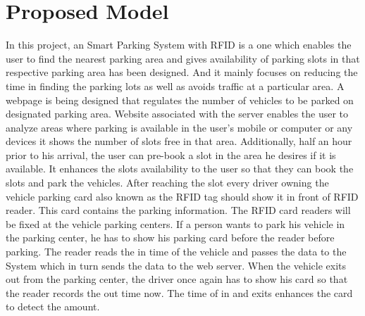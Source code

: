 \documentclass[12pt,a4paper]{report}
\begin{document}
\section{Proposed Model}
In this project, an Smart Parking System with RFID is a
one which enables the user to find the nearest parking area and gives availability of parking slots in that respective parking area has
been designed. And it mainly focuses on reducing the time in finding the parking lots as well as avoids traffic at a particular area. A
webpage is being designed that regulates the number of vehicles to be parked on designated parking area.
Website associated with the server enables the user to analyze areas where parking is available in the user’s mobile or computer or
any devices it shows the number of slots free in that area. Additionally, half an hour prior to his arrival, the user can pre-book a slot
in the area he desires if it is available. It enhances the slots availability to the user so that they can book the slots and park the
vehicles.
After reaching the slot every driver owning the vehicle parking card also known as the RFID tag should show it in front of RFID
reader. This card contains the parking information. The RFID card readers will be fixed at the vehicle parking centers. If a person wants
to park his vehicle in the parking center, he has to show his parking card before the reader before parking. The reader reads the in time
of the vehicle and passes the data to the System which in turn sends the data to the web server. When the vehicle exits out from the
parking center, the driver once again has to show his card so that the reader records the out time now. The time of in and exits
enhances the card to detect the amount.
\end{document}
